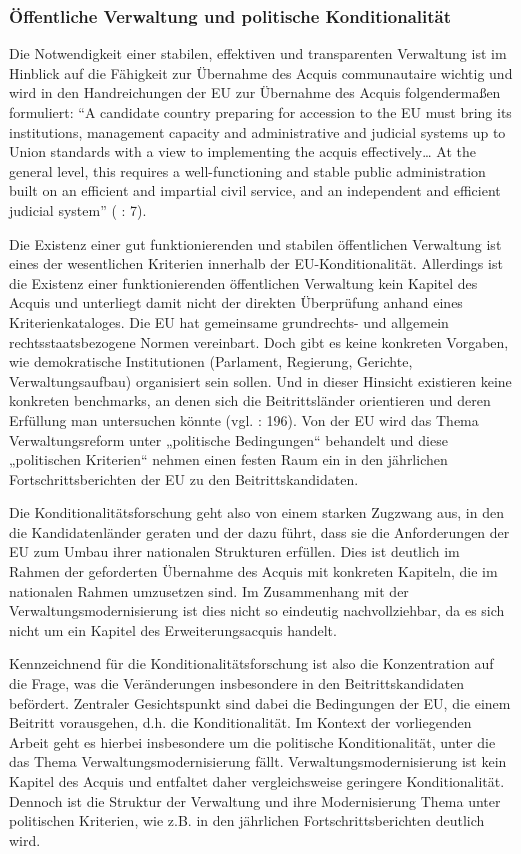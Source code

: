 \subsubsection{Öffentliche Verwaltung und politische Konditionalität}

Die Notwendigkeit einer stabilen, effektiven und transparenten Verwaltung ist im Hinblick auf die Fähigkeit zur Übernahme des Acquis communautaire wichtig und wird in den Handreichungen der EU zur Übernahme des Acquis folgendermaßen formuliert: “A candidate country preparing for accession to the EU must bring its institutions, management capacity and administrative and judicial systems up to Union standards with a view to implementing the acquis effectively… At the general level, this requires a well-functioning and stable public administration built on an efficient and impartial civil service, and an independent and efficient judicial system” (\cite{eurcom05} : 7).\par
Die Existenz einer gut funktionierenden und stabilen öffentlichen Verwaltung ist eines der wesentlichen Kriterien innerhalb der EU-Konditionalität. Allerdings ist die Existenz einer funktionierenden öffentlichen Verwaltung kein Kapitel des Acquis und unterliegt damit nicht der direkten Überprüfung anhand eines Kriterienkataloges. Die EU hat gemeinsame grundrechts- und allgemein rechtsstaatsbezogene Normen vereinbart. Doch gibt es keine konkreten Vorgaben, wie demokratische Institutionen (Parlament, Regierung, Gerichte, Verwaltungsaufbau) organisiert sein sollen. Und in dieser Hinsicht existieren keine konkreten benchmarks, an denen sich die Beitrittsländer orientieren und deren Erfüllung man untersuchen könnte (vgl. \cite{brusis09} : 196). Von der EU wird das Thema Verwaltungsreform unter „politische Bedingungen“ behandelt und diese „politischen Kriterien“ nehmen einen festen Raum ein in den jährlichen Fortschrittsberichten der EU zu den Beitrittskandidaten.\par
Die Konditionalitätsforschung geht also von einem starken Zugzwang aus, in den die Kandidatenländer geraten und der dazu führt, dass sie die Anforderungen der EU zum Umbau ihrer nationalen Strukturen erfüllen. Dies ist deutlich im Rahmen der geforderten Übernahme des Acquis mit konkreten Kapiteln, die im nationalen Rahmen umzusetzen sind. Im Zusammenhang mit der Verwaltungsmodernisierung ist dies nicht so eindeutig nachvollziehbar, da es sich nicht um ein Kapitel des Erweiterungsacquis handelt.\par
Kennzeichnend für die Konditionalitätsforschung ist also die Konzentration auf die Frage, was die Veränderungen insbesondere in den Beitrittskandidaten befördert. Zentraler Gesichtspunkt sind dabei die Bedingungen der EU, die einem Beitritt vorausgehen, d.h. die Konditionalität. Im Kontext der vorliegenden Arbeit geht es hierbei insbesondere um die politische Konditionalität, unter die das Thema Verwaltungsmodernisierung fällt. Verwaltungsmodernisierung ist kein Kapitel des Acquis und entfaltet daher vergleichsweise geringere Konditionalität. Dennoch ist die Struktur der Verwaltung und ihre Modernisierung Thema unter politischen Kriterien, wie z.B. in den jährlichen Fortschrittsberichten deutlich wird.\par
